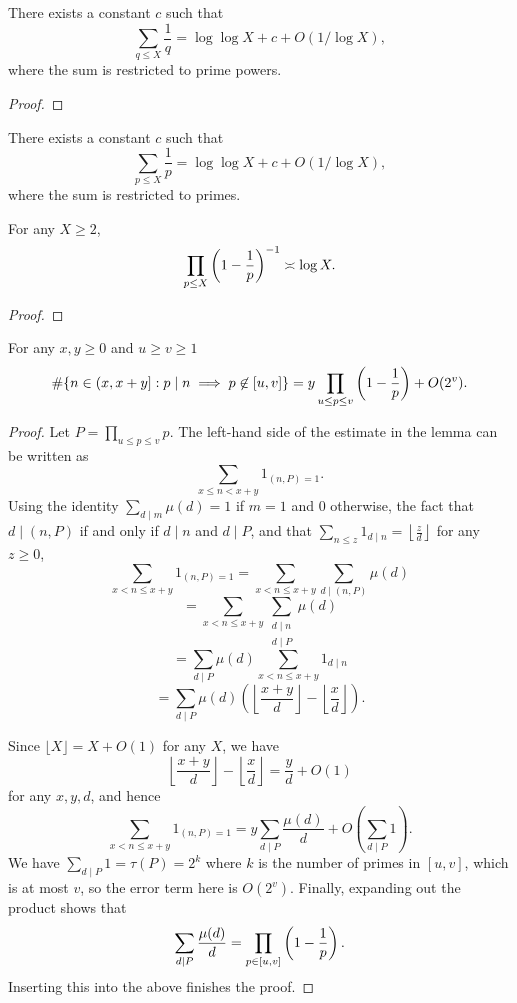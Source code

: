 \begin{lemma}\label{lem:mertens1}
There exists a constant $c$ such that
\[\sum_{q\leq X}\frac{1}{q} = \log\log X+c+O(1/\log X),\]
where the sum is restricted to prime powers.
\end{lemma}
\begin{proof}

\end{proof}

\begin{lemma}\label{lem:mertensprimes}
There exists a constant $c$ such that
\[\sum_{p\leq X}\frac{1}{p} = \log\log X+c+O(1/\log X),\]
where the sum is restricted to primes.
\end{lemma}

\begin{lemma}\label{lem:mertens2}
For any $X\geq 2$,
\[\prod_{p\leq X}\left( 1-\frac{1}{p}\right)^{-1}\asymp \log X.\]
\end{lemma}
\begin{proof}

\end{proof}

\begin{lemma}\label{lem:sieve_eratosthenes}
For any $x,y\geq 0$ and $u\geq v\geq 1$
\[\#\{ n\in (x,x+y] : p\mid n\implies p\not\in [u,v]\} = y\prod_{u\leq p\leq v}\left( 1-\frac{1}{p}\right)+O(2^v).\]
\end{lemma}
\begin{proof}
Let $P = \prod_{u\leq p\leq v}p$. The left-hand side of the estimate in the lemma can be written as
\[\sum_{x\leq n<x+y}1_{(n,P)=1}.\]
Using the identity $\sum_{d\mid m}\mu(d) = 1$ if $m=1$ and $0$ otherwise, the fact that $d\mid (n,P)$ if and only if $d\mid n$ and $d\mid P$, and that $\sum_{n\leq z}1_{d\mid n}=\left\lfloor\frac{z}{d}\right\rfloor$ for any $z\geq 0$,
\[
\sum_{x< n\leq x+y}1_{(n,P)=1}= \sum_{x< n\leq x+y}\sum_{d\mid (n,P)}\mu(d)\]
\[= \sum_{x< n\leq x+y}\sum_{\substack{d\mid n\\ d\mid P}}\mu(d)\]
\[=\sum_{d\mid P}\mu(d)\sum_{x< n\leq x+y}1_{d\mid n}\]
\[=\sum_{d\mid P}\mu(d)\left(\left\lfloor \frac{x+y}{d}\right\rfloor-\left\lfloor\frac{x}{d}\right\rfloor\right).\]

Since $\lfloor X\rfloor = X+O(1)$ for any $X$, we have
\[\left\lfloor \frac{x+y}{d}\right\rfloor-\left\lfloor\frac{x}{d}\right\rfloor=\frac{y}{d}+O(1)\]
 for any $x,y,d$, and hence
\[\sum_{x< n\leq x+y}1_{(n,P)=1}=y\sum_{d\mid P}\frac{\mu(d)}{d}+O(\sum_{d\mid P}1).\]
We have $\sum_{d\mid P}1=\tau(P)=2^k$ where $k$ is the number of primes in $[u,v]$, which is at most $v$, so the error term here is $O(2^v)$. Finally, expanding out the product shows that
\[\sum_{d\mid P}\frac{\mu(d)}{d} = \prod_{p\in[u,v]}\left( 1-\frac{1}{p}\right).\]
Inserting this into the above finishes the proof.
\end{proof}
